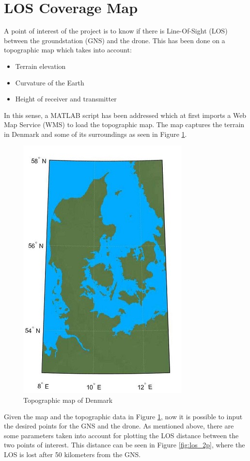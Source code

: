 \section{LOS Coverage Map}
A point of interest of the project is to know if there is Line-Of-Sight (LOS) between the groundstation (GNS) and the drone. This has been done on a topographic map which takes into account:

\begin{itemize}
	\item Terrain elevation
	\item Curvature of the Earth
	\item Height of receiver and transmitter
\end{itemize}

In this sense, a MATLAB script has been addressed which at first imports a Web Map Service (WMS) to load the topographic map. The map captures the terrain in Denmark and some of its surroundings as seen in Figure \ref{fig:dk_map}.

\begin{figure}[h]
	\centering
	\includegraphics[scale=2]{figures/denmark.jpg}
	\caption{Topographic map of Denmark}
   	\label{fig:dk_map}
\end{figure}

Given the map and the topographic data in Figure \ref{fig:dk_map}, now it is possible to input the desired points for the GNS and the drone. As mentioned above, there are some parameters taken into account for plotting the LOS distance between the two points of interest. This distance can be seen in Figure \ref{fig:los_2p}, where the LOS is lost after 50 kilometers from the GNS.

